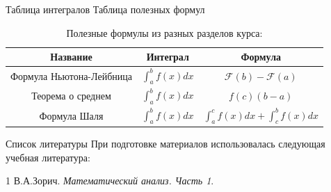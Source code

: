 \documentclass{beamer}
\begin{document}
\begin{frame}{Таблица интегралов}
Таблица полезных формул 

\begin{table}
\centering
\small
\begin{tabular}{|c|c|c|}
\hline
\textbf{Название} & \textbf{Интеграл} & \textbf{Формула} \\
\hline
Формула Ньютона-Лейбница & $\int_{a}^{b} f(x)dx$ & $ \mathcal{F}(b) - \mathcal{F}(a)$ \\
\hline
Теорема о среднем & $\int_{a}^{b} f(x)dx$ & $ f(c)(b - a)$ \\
\hline
Формула Шаля & $\int_{a}^{b} f(x)dx$ & $ \int_{a}^{c} f(x)dx + \int_{c}^{b} f(x)dx$ \\
\hline
\end{tabular}
\caption{Полезные формулы из разных разделов курса:}
\end{table}
\end{frame}


\begin{frame}{Список литературы}
При подготовке материалов использовалась следующая учебная литература:

\begin{thebibliography}{1}
В.А.Зорич.
\textit{Математический анализ. Часть 1}.
\end{thebibliography}
\end{frame}
\end{document}
